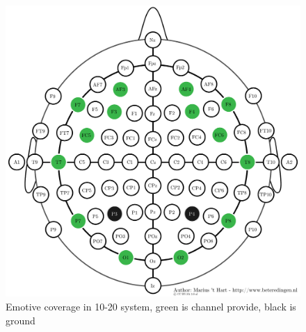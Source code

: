 \begin{figure}[ht]
	\centering
	\includegraphics[scale = 0.4]{chapter3/emotiv_electrodes_cover.pdf}
	\caption{Emotive coverage in 10-20 system, green is channel provide, black is ground}
\end{figure}

